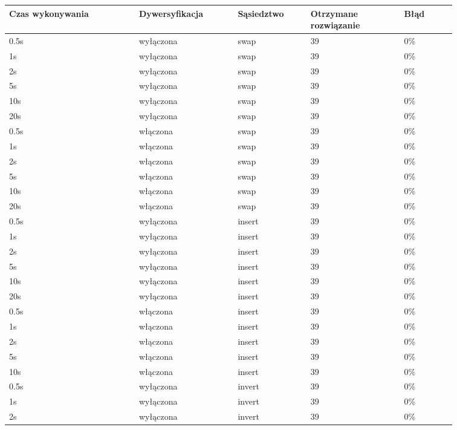 \documentclass[12pt,a4paper,titlepage]{article}
\begin{document}
\begin{table}[H]
    \centering
	{\begin{tabular}{|p{0.25\linewidth}p{0.19\linewidth}p{0.14\linewidth}p{0.18\linewidth}p{0.1\linewidth}|}
		\hline
        Czas wykonywania & Dywersyfikacja & Sąsiedztwo & Otrzymane rozwiązanie & Błąd \\
		\hline
        0.5s & wyłączona & swap & 39 & 0\% \\
        1s & wyłączona & swap & 39 & 0\% \\
        2s & wyłączona & swap & 39 & 0\% \\
        5s & wyłączona & swap & 39 & 0\% \\
        10s & wyłączona & swap & 39 & 0\% \\
        20s & wyłączona & swap & 39 & 0\% \\
        \hline
        0.5s & włączona & swap & 39 & 0\% \\
        1s & włączona & swap & 39 & 0\% \\
        2s & włączona & swap & 39 & 0\% \\
        5s & włączona & swap & 39 & 0\% \\
        10s & włączona & swap & 39 & 0\% \\
        20s & włączona & swap & 39 & 0\% \\
		\hline
		0.5s & wyłączona & insert & 39 & 0\% \\
        1s & wyłączona & insert & 39 & 0\% \\
        2s & wyłączona & insert & 39 & 0\% \\
        5s & wyłączona & insert & 39 & 0\% \\
        10s & wyłączona & insert & 39 & 0\% \\
        20s & wyłączona & insert & 39 & 0\% \\
        \hline
        0.5s & włączona & insert & 39 & 0\% \\
        1s & włączona & insert & 39 & 0\% \\
        2s & włączona & insert & 39 & 0\% \\
        5s & włączona & insert & 39 & 0\% \\
        10s & włączona & insert & 39 & 0\% \\
        		\hline
		0.5s & wyłączona & invert & 39 & 0\% \\
        1s & wyłączona & invert & 39 & 0\% \\
        2s & wyłączona & invert & 39 & 0\% \\

\end{tabular}}
\end{table}
\end{document}
